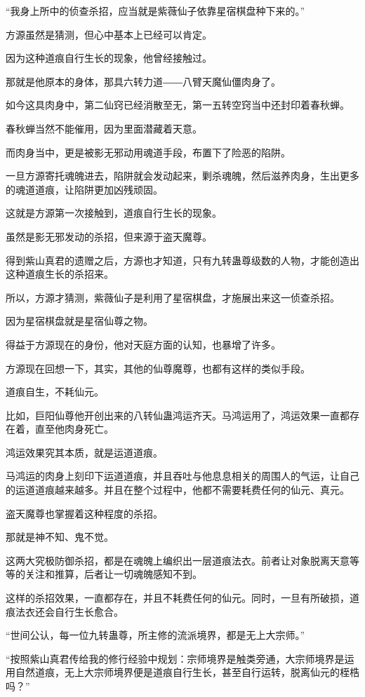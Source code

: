 \begin{this_body}
“我身上所中的侦查杀招，应当就是紫薇仙子依靠星宿棋盘种下来的。”

方源虽然是猜测，但心中基本上已经可以肯定。

因为这种道痕自行生长的现象，他曾经接触过。

那就是他原本的身体，那具六转力道――八臂天魔仙僵肉身了。

如今这具肉身中，第二仙窍已经消散至无，第一五转空窍当中还封印着春秋蝉。

春秋蝉当然不能催用，因为里面潜藏着天意。

而肉身当中，更是被影无邪动用魂道手段，布置下了险恶的陷阱。

一旦方源寄托魂魄进去，陷阱就会发动起来，剿杀魂魄，然后滋养肉身，生出更多的魂道道痕，让陷阱更加凶残顽固。

这就是方源第一次接触到，道痕自行生长的现象。

虽然是影无邪发动的杀招，但来源于盗天魔尊。

得到紫山真君的遗赠之后，方源也才知道，只有九转蛊尊级数的人物，才能创造出这种道痕生长的杀招来。

所以，方源才猜测，紫薇仙子是利用了星宿棋盘，才施展出来这一侦查杀招。

因为星宿棋盘就是星宿仙尊之物。

得益于方源现在的身份，他对天庭方面的认知，也暴增了许多。

方源现在回想一下，其实，其他的仙尊魔尊，也都有这样的类似手段。

道痕自生，不耗仙元。

比如，巨阳仙尊他开创出来的八转仙蛊鸿运齐天。马鸿运用了，鸿运效果一直都存在着，直至他肉身死亡。

鸿运效果究其本质，就是运道道痕。

马鸿运的肉身上刻印下运道道痕，并且吞吐与他息息相关的周围人的气运，让自己的运道道痕越来越多。并且在整个过程中，他都不需要耗费任何的仙元、真元。

盗天魔尊也掌握着这种程度的杀招。

那就是神不知、鬼不觉。

这两大究极防御杀招，都是在魂魄上编织出一层道痕法衣。前者让对象脱离天意等等的关注和推算，后者让一切魂魄感知不到。

这样的杀招效果，一直都存在，并且不耗费任何的仙元。同时，一旦有所破损，道痕法衣还会自行生长愈合。

“世间公认，每一位九转蛊尊，所主修的流派境界，都是无上大宗师。”

“按照紫山真君传给我的修行经验中规划：宗师境界是触类旁通，大宗师境界是运用自然道痕，无上大宗师境界便是道痕自行生长，甚至自行运转，脱离仙元的桎梏吗？”


\end{this_body}
